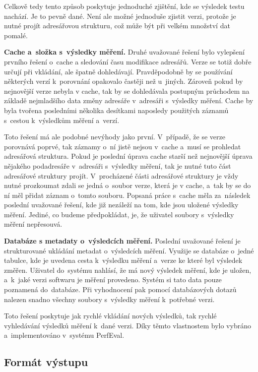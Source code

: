 Celkově tedy tento způsob poskytuje jednoduché zjištění, kde se výsledek testu nachází. Je to pevně dané. Není ale možné jednoduše
zjistit verzi, protože je nutné projít adresářovou strukturu, což může být při velkém množství dat pomalé.

\medskip

\noindent\textbf{Cache a~složka s~výsledky měření.} Druhé uvažované řešení bylo vylepšení prvního řešení o~cache a sledování času modifikace adresářů.
Verze se totiž dobře určují při vkládání,
ale špatně dohledávají. Pravděpodobně by se používání některých verzí k~porovnání opakovalo častěji než u~jiných.
Zároveň pokud by nejnovější verze nebyla v cache, tak by se dohledávala postupným průchodem na základě nejmladšího data změny adresáře
v~adresáři s~výsledky měření. Cache by byla tvořena posledními několika desítkami naposledy použitých záznamů s~cestou k~výsledkům měření a~verzí.

Toto řešení má ale podobné nevýhody jako první. V~případě, že se verze porovnává poprvé, tak záznamy o~ní jistě nejsou v~cache
a~musí se prohledat adresářová struktura. Pokud je poslední úprava cache starší než nejnovější úprava nějakého podadresáře v~adresáři
s~výsledky měření, tak je nutné tuto část adresářové struktury projít. V~procházené části adresářové struktury je vždy nutné prozkoumat
zdali se jedná o~soubor verze, která je v cache, a~tak by se do ní měl přidat záznam o~tomto souboru. Popsaná práce s~cache měla
za~následek poslední uvažované řešení, kde již nezáleží na tom, kde jsou uložené výsledky měření. Jediné, co budeme předpokládat, je,
že uživatel soubory s~výsledky měření nepřesouvá.

\medskip

\noindent\textbf{Databáze s metadaty o~výsledcích měření.} Poslední uvažované řešení je strukturované ukládání metadat o~výsledcích měření. Využije se databáze o~jedné tabulce, kde
je uvedena cesta k~výsledku měření a~verze ke které byl výsledek změřen. Uživatel do~systému nahlásí, že má nový výsledek
měření, kde je uložen, a~k~jaké verzi softwaru je měření provedeno. Systém si tato data pouze poznamená do~databáze. Při
vyhodnocení pak pomocí databázových dotazů nalezen snadno všechny soubory s~výsledky měření k~potřebné verzi.

Toto řešení poskytuje jak rychlé vkládání nových výsledků, tak rychlé vyhledávání výsledků měření k~dané verzi.
Díky těmto vlastnostem bylo vybráno a~implementováno v~systému PerfEval.

\subsection{Formát výstupu}

